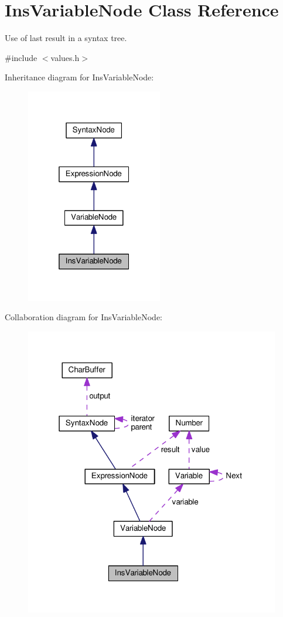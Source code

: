 \hypertarget{classInsVariableNode}{}\section{Ins\+Variable\+Node Class Reference}
\label{classInsVariableNode}


Use of last result in a syntax tree.  




{\ttfamily \#include $<$values.\+h$>$}



Inheritance diagram for Ins\+Variable\+Node\+:\nopagebreak
\begin{figure}[H]
\begin{center}
\leavevmode
\includegraphics[width=169pt]{classInsVariableNode__inherit__graph}
\end{center}
\end{figure}


Collaboration diagram for Ins\+Variable\+Node\+:\nopagebreak
\begin{figure}[H]
\begin{center}
\leavevmode
\includegraphics[width=316pt]{classInsVariableNode__coll__graph}
\end{center}
\end{figure}

